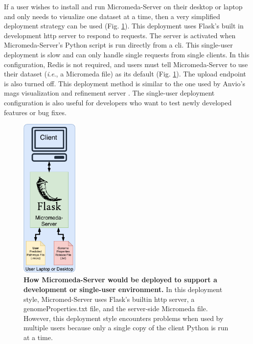 If a user wishes to install and run Micromeda-Server on their desktop or laptop 
and only needs to visualize one dataset at a time, then a very simplified 
deployment strategy can be used (Fig. \ref{fig:micromeda-small-deploy}). This 
deployment uses Flask's built in development \gls{http} server to respond to 
requests. The server is activated when Micromeda-Server's Python script is run 
directly from a \gls{cli}. This single-user deployment is slow and can only 
handle single requests from single clients. In this configuration, Redis is not 
required, and users must tell Micromeda-Server to use their dataset (\textit{i}.\textit{e}., a 
Micromeda file) as its default (Fig. \ref{fig:micromeda-small-deploy}). The 
upload endpoint is also turned off. This deployment method is similar to the one 
used by Anvio's \gls{mags} visualization and refinement server 
\cite{eren2015anvi}. The single-user deployment configuration is also useful for 
developers who want to test newly developed features or bug fixes.

\begin{figure}[!ht]
  \centering
	\includegraphics[width=0.25\textwidth]{media/micromeda-simple-deployment.pdf}
	 \caption[How Micromeda-Server would be deployed to support a development or 
single-user environment.]{\textbf{How Micromeda-Server would be deployed to 
support a development or single-user environment.} In this deployment style, 
Micromed-Server uses Flask's builtin \gls{http} server, a genomeProperties.txt 
file, and the server-side Micromeda file. However, this deployment style 
encounters problems when used by multiple users because only a single copy of 
the client Python is run at a time.}
	 \label{fig:micromeda-small-deploy}
\end{figure}

